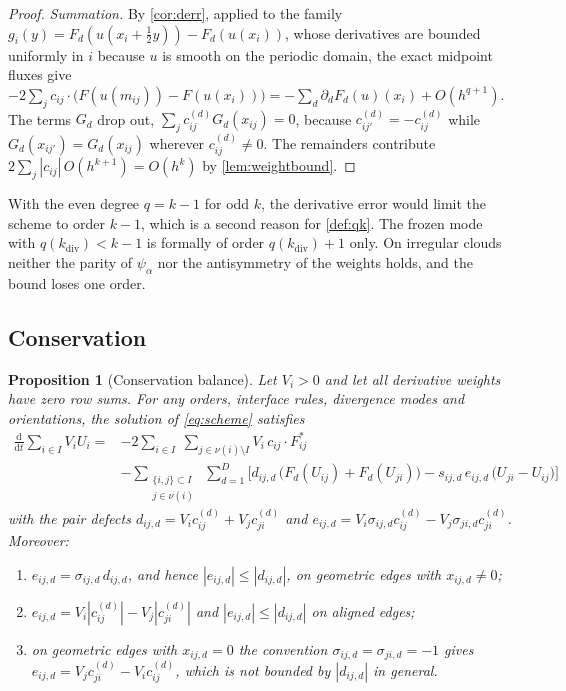 \documentclass[11pt,a4paper]{article}
\theoremstyle{plain}
\newtheorem{proposition}[theorem]{Proposition}
\theoremstyle{definition}
\theoremstyle{remark}
\numberwithin{equation}{section}
\newcommand{\dd}{\mathrm{d}}
\newcommand{\nb}{\nu}
\newcommand{\Fs}{F^{*}}
\newcommand{\qdiv}{q}
\begin{document}
\begin{proof}
\emph{Summation.} By \cref{cor:derr}, applied to the family $g_i(y)=F_d(u(x_i+\tfrac12y))-F_d(u(x_i))$, whose derivatives are bounded uniformly in $i$ because $u$ is smooth on the periodic domain, the exact midpoint fluxes give $-2\sum_jc_{ij}\cdot\big(F(u(m_{ij}))-F(u(x_i))\big)=-\sum_d\partial_dF_d(u)(x_i)+O(h^{q+1})$. The terms $G_d$ drop out, $\sum_jc^{(d)}_{ij}G_d(x_{ij})=0$, because $c^{(d)}_{ij'}=-c^{(d)}_{ij}$ while $G_d(x_{ij'})=G_d(x_{ij})$ wherever $c^{(d)}_{ij}\ne0$. The remainders contribute $2\sum_j|c_{ij}|\,O(h^{k+1})=O(h^k)$ by \cref{lem:weightbound}.
\end{proof}

With the even degree $q=k-1$ for odd $k$, the derivative error would limit the scheme to order $k-1$, which is a second reason for \cref{def:qk}. The frozen mode with $\qdiv(k_{\mathrm{div}})<k-1$ is formally of order $\qdiv(k_{\mathrm{div}})+1$ only. On irregular clouds neither the parity of $\psi_\alpha$ nor the antisymmetry of the weights holds, and the bound loses one order.

\subsection{Conservation}\label{sec:conservation}

\begin{proposition}[Conservation balance]\label{prop:conservation}
Let $V_i>0$ and let all derivative weights have zero row sums. For any orders, interface rules, divergence modes and orientations, the solution of \eqref{eq:scheme} satisfies
\begin{equation}\label{eq:balance}
\begin{aligned}
\frac{\dd}{\dd t}\sum_{i\in I}V_iU_i
={}& -2\sum_{i\in I}\ \sum_{j\in\nb(i)\setminus I} V_i\,c_{ij}\cdot\Fs_{ij}\\
&-\sum_{\substack{\{i,j\}\subset I\\ j\in\nb(i)}}\ \sum_{d=1}^D\Big[d_{ij,d}\,\big(F_d(U_{ij})+F_d(U_{ji})\big)-s_{ij,d}\,e_{ij,d}\,\big(U_{ji}-U_{ij}\big)\Big]
\end{aligned}
\end{equation}
with the pair defects $d_{ij,d}=V_ic^{(d)}_{ij}+V_jc^{(d)}_{ji}$ and $e_{ij,d}=V_i\sigma_{ij,d}c^{(d)}_{ij}-V_j\sigma_{ji,d}c^{(d)}_{ji}$. Moreover:
\begin{enumerate}[label=(\roman*)]
\item $e_{ij,d}=\sigma_{ij,d}\,d_{ij,d}$, and hence $|e_{ij,d}|\le|d_{ij,d}|$, on geometric edges with $x_{ij,d}\ne0$;
\item $e_{ij,d}=V_i|c^{(d)}_{ij}|-V_j|c^{(d)}_{ji}|$ and $|e_{ij,d}|\le|d_{ij,d}|$ on aligned edges;
\item on geometric edges with $x_{ij,d}=0$ the convention $\sigma_{ij,d}=\sigma_{ji,d}=-1$ gives $e_{ij,d}=V_jc^{(d)}_{ji}-V_ic^{(d)}_{ij}$, which is not bounded by $|d_{ij,d}|$ in general.
\end{enumerate}
\end{proposition}
\end{document}
